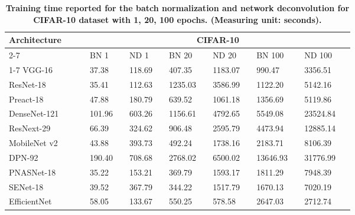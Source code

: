 \begin{table}[H]
    \caption{\textbf{Training time reported for the batch normalization and network deconvolution for CIFAR-10 dataset with 1, 20, 100 epochs. (Measuring unit: seconds).}}
    \centering
    \begin{tabular}{p{0.18\linewidth}p{0.08\linewidth}p{0.08\linewidth}|p{0.08\linewidth}p{0.08\linewidth}|p{0.08\linewidth}p{0.1\linewidth}}
  \hline
  \multirow{3}{*}{\textbf{Architecture}} & \multicolumn{6}{c}{\textbf{CIFAR-10}} \\
   \cmidrule{2-7}
  \multirow{3}{*}{}  & BN 1 & ND 1 & BN 20 & ND 20 & BN 100 & ND 100\\
    \cmidrule{1-7}
    VGG-16 & 37.38 & 118.69 & 407.35 & 1183.07 & 990.47 & 3356.51 \\
    ResNet-18 & 35.41 & 112.63 & 1235.03 & 3586.99 & 1122.20 & 5142.16 \\
    Preact-18 & 47.88 & 180.79 & 639.52 & 1061.18 & 1356.69 & 5119.86 \\
    DenseNet-121 & 101.96 & 603.26 & 1156.61 & 4792.65 & 5549.08 & 23524.84 \\
    ResNext-29 & 66.39 & 324.62 & 906.48 & 2595.79 & 4473.94 & 12885.14 \\
    MobileNet v2 & 43.88 & 393.73 & 492.24 & 1738.16 & 2183.71 & 8106.39 \\
    DPN-92 & 190.40 & 708.68 & 2768.02 & 6500.02 & 13646.93 & 31776.99 \\
    PNASNet-18 & 35.22 & 153.21 & 369.79 & 1593.17 & 1811.29 & 7948.39 \\
    SENet-18 & 39.52 & 367.79 & 344.22 & 1517.79 & 1670.13 & 7020.19 \\
    EfficientNet & 58.05 & 133.67 & 550.25 & 578.58 & 2647.03 & 2712.74 \\
   \hline
\end{tabular}
\label{tab:cifar10-train-times}
\end{table}

